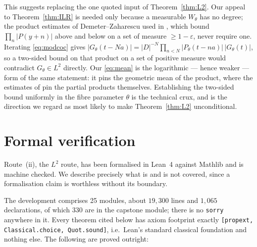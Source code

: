 \documentclass[11pt]{amsart}
\theoremstyle{remark}
\begin{document}
This suggests replacing the one quoted input of Theorem~\ref{thm:L2}. Our appeal to
Theorem~\ref{thm:ILR} is needed only because a measurable $W_\theta$ has no degree; the
product estimates of Demeter--Zaharescu used in \cite{GO}, which bound
$\prod_{n}|P(y+n)|$ above and below on a set of measure $\geq1-\varepsilon$, never require
one. Iterating \eqref{eq:modcoc} gives
$|G_\theta(t-Na)|=|D|^{-N}\prod_{n<N}|P_\theta(t-na)|\,|G_\theta(t)|$, so a two-sided bound on
that product on a set of positive measure would contradict $G_\theta\in L^2$ directly. Our
\eqref{eq:mean} is the logarithmic --- hence weaker --- form of the same statement: it pins
the geometric mean of the product, where the estimates of \cite{GO} pin the partial products
themselves. Establishing the two-sided bound uniformly in the fibre parameter $\theta$ is the
technical crux, and is the direction we regard as most likely to make Theorem~\ref{thm:L2}
unconditional.

\section{Formal verification}\label{sec:lean}

Route~(ii), the $L^2$ route, has been formalised in Lean~4 against Mathlib and is machine
checked. We describe precisely what is and is not covered, since a formalisation claim is
worthless without its boundary.

The development comprises 25 modules, about $19{,}300$ lines and $1{,}065$ declarations, of
which 330 are in the capstone module; there is no \texttt{sorry} anywhere in it. Every
theorem cited below has axiom footprint exactly
\texttt{[propext, Classical.choice, Quot.sound]}, i.e.\ Lean's standard classical foundation
and nothing else. The following are proved outright:
\end{document}
